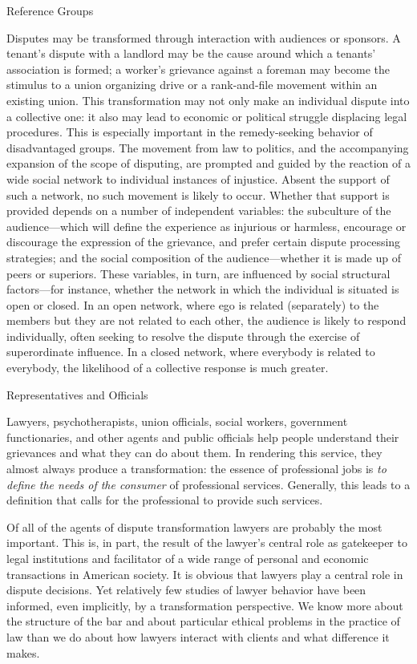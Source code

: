 \documentclass[11pt,letterpaper,twoside]{article}
\begin{document}
{Reference Groups}

Disputes may be transformed through interaction with audiences or
sponsors. A tenant's dispute with a landlord may be the cause around
which a tenants' association is formed; a worker's grievance against a
foreman may become the stimulus to a union organizing drive or a
rank-and-file movement within an existing union. This transformation may
not only make an individual dispute into a collective one: it also may
lead to economic or political struggle displacing legal procedures. This
is especially important in the remedy-seeking behavior of disadvantaged
groups. The movement from law to politics, and the accompanying
expansion of the scope of disputing, are prompted and guided by the
reaction of a wide social network to individual instances of injustice.
Absent the support of such a network, no such movement is likely to
occur. Whether that support is provided depends on a number of
independent variables: the subculture of the audience---which will
define the experience as injurious or harmless, encourage or discourage
the expression of the grievance, and prefer certain dispute processing
strategies; and the social composition of the audience---whether it is
made up of peers or superiors. These variables, in turn, are influenced
by social structural factors---for instance, whether the network in
which the individual is situated is open or closed. In an open network,
where ego is related (separately) to the members but they are not
related to each other, the audience is likely to respond individually,
often seeking to resolve the dispute through the exercise of
superordinate influence. In a closed network, where everybody is related
to everybody, the likelihood of a collective response is much greater.

{Representatives and Officials}

Lawyers, psychotherapists, union officials, social workers, government
functionaries, and other agents and public officials help people
understand their grievances and what they can do about them. In
rendering this service, they almost always produce a transformation: the
essence of professional jobs is \emph{to define the needs of the
consumer} of professional services. Generally, this leads to a
definition that calls for the professional to provide such services.

Of all of the agents of dispute transformation lawyers are probably the
most important. This is, in part, the result of the lawyer's central
role as gatekeeper to legal institutions and facilitator of a wide range
of personal and economic transactions in American society. It is obvious
that lawyers play a central role in dispute decisions. Yet relatively
few studies of lawyer behavior have been informed, even implicitly, by a
transformation perspective. We know more about the structure of the bar
and about particular ethical problems in the practice of law than we do
about how lawyers interact with clients and what difference it makes.
\end{document}
